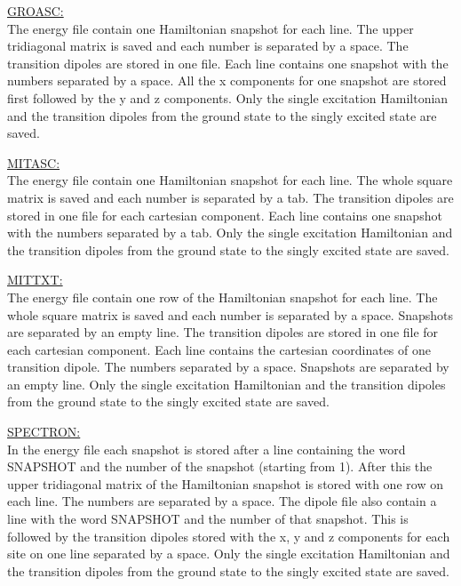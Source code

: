 \noindent
\underline{GROASC:}\\
The energy file contain one Hamiltonian snapshot for each line. The upper tridiagonal matrix is saved and each number is separated by a space. The transition dipoles are stored in one file. Each line contains one snapshot with the numbers separated by a space. All the x components for one snapshot are stored first followed by the y and z components. Only the single excitation Hamiltonian and the transition dipoles from the ground state to the singly excited state are saved.

\noindent
\underline{MITASC:}\\
The energy file contain one Hamiltonian snapshot for each line. The whole square matrix is saved and each number is separated by a tab. The transition dipoles are stored in one file for each cartesian component. Each line contains one snapshot with the numbers separated by a tab. Only the single excitation Hamiltonian and the transition dipoles from the ground state to the singly excited state are saved.

\noindent
\underline{MITTXT:}\\
The energy file contain one row of the Hamiltonian snapshot for each line. The whole square matrix is saved and each number is separated by a space. Snapshots are separated by an empty line. The transition dipoles are stored in one file for each cartesian component. Each line contains the cartesian coordinates of one transition dipole. The numbers separated by a space. Snapshots are separated by an empty line. Only the single excitation Hamiltonian and the transition dipoles from the ground state to the singly excited state are saved.

\noindent
\underline{SPECTRON:}\\
In the energy file each snapshot is stored after a line containing the word SNAPSHOT and the number
of the snapshot (starting from 1). After this the upper tridiagonal matrix of the Hamiltonian snapshot is stored with one row on each line. The numbers are separated by a space. The dipole file also contain a line with the word SNAPSHOT and the number of that snapshot. This is followed by the transition dipoles stored with the x, y and z components for each site on one line separated by a space. Only the single excitation Hamiltonian and the transition dipoles from the ground state to the singly excited state are saved.



